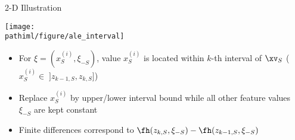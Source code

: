 \documentclass[11pt,compress,t,notes=noshow, aspectratio=169, xcolor=table]{beamer}
\newcommand{\pathiml}{../../slides/03_feature-effects/}
\begin{document}
\begin{frame}{2-D Illustration}
\centerline{\texttt{[image: \\pathiml/figure/ale\_interval]}}

 \begin{itemize}
  \item For $\xi = (x_S^{(i)}, \xi_{-S})$, value $x_S^{(i)}$ is located within $k$-th interval of $\xv_S$ ($x_S^{(i)} \in \; ]z_{k-1, S}, z_{k, S}]$)
  \item Replace $x_S^{(i)}$ by upper/lower interval bound while all other feature values $\xi_{-S}$ are kept constant
  \item Finite differences correspond to $\fh(z_{k, S}, \xi_{-S}) - \fh(z_{k-1, S}, \xi_{-S})$
\end{itemize}

\end{frame}
\end{document}
